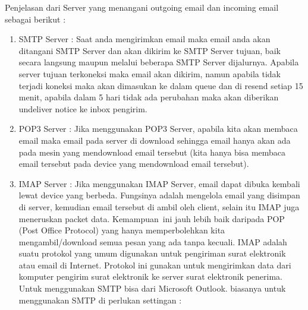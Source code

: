  \par
\vspace{12pt}
\noindent 
Penjelasan dari Server yang menangani outgoing email dan incoming email sebagai berikut : \par
\noindent 
\begin{enumerate}
\item SMTP Server : Saat anda mengirimkan email maka email anda akan ditangani SMTP Server dan akan dikirim ke SMTP Server tujuan, baik secara langsung maupun melalui beberapa SMTP Server dijalurnya. Apabila server tujuan terkoneksi maka email akan dikirim, namun apabila tidak terjadi koneksi maka akan dimasukan ke dalam queue dan di resend setiap 15 menit, apabila dalam 5 hari tidak ada perubahan maka akan diberikan undeliver notice ke inbox pengirim. \par
\vspace{12pt}
\noindent 
\item POP3 Server : Jika menggunakan POP3 Server, apabila kita akan membaca email maka email pada server di download sehingga email hanya akan ada pada mesin yang mendownload email tersebut (kita hanya bisa membaca email tersebut pada device yang mendownload email tersebut). \par
\vspace{12pt}
\noindent 
\item IMAP Server : Jika menggunakan IMAP Server, email dapat dibuka kembali lewat device yang berbeda. Fungsinya adalah mengelola email yang disimpan di server, kemudian email tersebut di ambil oleh client, selain itu IMAP juga meneruskan packet data. Kemampuan~ini jauh lebih baik daripada POP (Post Office Protocol) yang hanya memperbolehkan kita mengambil/download semua pesan yang ada tanpa kecuali. IMAP adalah suatu  protokol yang umum digunakan untuk pengiriman surat elektronik atau email di Internet. Protokol ini gunakan untuk mengirimkan data dari komputer pengirim surat elektronik ke server surat elektronik penerima. Untuk menggunakan SMTP bisa dari Microsoft Outlook. biasanya untuk menggunakan SMTP di perlukan settingan :\end{enumerate}
 \par
\vspace{12pt}
\noindent 
